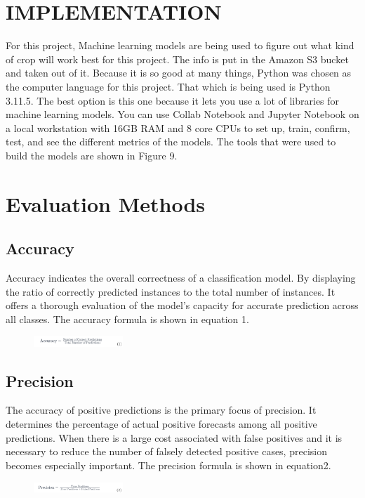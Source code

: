 \section{IMPLEMENTATION}
 For this project, Machine learning models are being used to figure out what kind of crop will work best for this project. The info is put in the Amazon S3 bucket and taken out of it. Because it is so good at many things, Python was chosen as the computer language for this project. That which is being used is Python 3.11.5. The best option is this one because it lets you use a lot of libraries for machine learning models. You can use Collab Notebook and Jupyter Notebook on a local workstation with 16GB RAM and 8 core CPUs to set up, train, confirm, test, and see the different metrics of the models. The tools that were used to build the models are shown in Figure 9.

 






 \section{Evaluation Methods}
 \subsection{Accuracy}
 Accuracy indicates the overall correctness of a classification model. By displaying the ratio of correctly predicted instances to the total number of instances. It offers a thorough evaluation of the model's capacity for accurate prediction across all classes. The accuracy formula is shown in equation 1.


 \begin{figure}[h]
    \centering
    \includegraphics[width=0.3\textwidth]{Screenshot 2023-12-11 010842.png}
\end{figure}

 \subsection{Precision}
 The accuracy of positive predictions is the primary focus of precision. It determines the percentage of actual positive forecasts among all positive predictions. When there is a large cost associated with false positives and it is necessary to reduce the number of falsely detected positive cases, precision becomes especially important. The precision formula is shown in equation2.
 \begin{figure}[h]
    \centering
    \includegraphics[width=0.3\textwidth]{Screenshot 2023-12-11 010914.png}
   
\end{figure}
